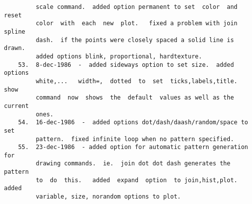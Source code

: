 \begin{verbatim}
         scale command.  added option permanent to set  color  and  reset
         color  with  each  new  plot.   fixed a problem with join spline
         dash.  if the points were closely spaced a solid line is  drawn.
         added options blink, proportional, hardtexture.  
    53.  8-dec-1986  -  added sideways option to set size.  added options
         white,...   width=,  dotted  to  set  ticks,labels,title.   show
         command  now  shows  the  default  values as well as the current
         ones.  
    54.  16-dec-1986  -  added options dot/dash/daash/random/space to set
         pattern.  fixed infinite loop when no pattern specified.  
    55.  23-dec-1986  - added option for automatic pattern generation for
         drawing commands.  ie.  join dot dot dash generates the  pattern
         to  do  this.   added  expand  option  to join,hist,plot.  added
         variable, size, norandom options to plot.  
\end{verbatim}
